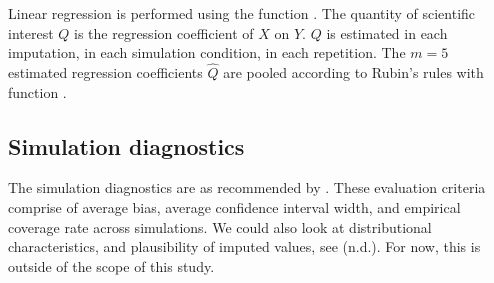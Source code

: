 \documentclass[article]{jss}
\newcommand{\fct}[1]{\code{#1()}}
\begin{document}
Linear regression is performed using the  function \fct{lm}. The quantity of scientific interest $Q$ is the regression coefficient of $X$ on $Y$. $Q$ is estimated in each imputation, in each simulation condition, in each repetition. The $m = 5$ estimated regression coefficients $\hat{Q}$ are pooled according to Rubin's \citeyear{rubin87} rules with  function \fct{pool}.

\subsection{Simulation diagnostics}
The simulation diagnostics are as recommended by \cite[\S~2.5.2]{buur18}. These evaluation criteria comprise of average bias, average confidence interval width, and empirical coverage rate across simulations. %
We could also look at distributional characteristics, and plausibility of imputed values, see \cite{vinknd} (n.d.). For now, this is outside of the scope of this study. %


\end{document}
